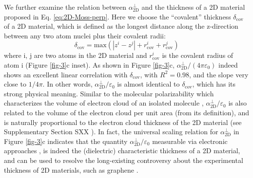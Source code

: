 \documentclass[journal=ancac3,manuscript=article,email=true,hyperref=true,keywords=false]{achemso}
\begin{document}
We further examine the relation between $\alpha_{\mathrm{2D}}^{\perp}$ and the
thickness of a 2D material proposed in
Eq. \ref{eq:2D-Moss-perp}. Here we choose the ``covalent'' thickness
$\delta_{\mathrm{cov}}$ of a 2D material, which is defined as the
longest distance along the z-direction between any two atom nuclei
plus their covalent radii:
\begin{equation}
  \label{eq:cov-thick}
  \delta_{\mathrm{cov}} = \mathrm{max}(|z^{i} - z^{j}|
  + r^{i}_{\mathrm{cov}} + r^{j}_{\mathrm{cov}})
\end{equation}
where i, j are two atoms in the 2D material and $r_{\mathrm{cov}}^{i}$
is the covalent radius of atom i (Figure \ref{fig-3}c inset). As shown
in Figure \ref{fig-3}c,
$\alpha_{\mathrm{2D}}^{\perp}/(4 \pi \varepsilon_{0})$ indeed shows an
excellent linear correlation with $\delta_{\mathrm{cov}}$, with
$R^{2}=0.98$, and the slope very close to $1/4\pi$. In other words,
$\alpha_{\mathrm{2D}}^{\perp} / \varepsilon_{0}$ is almost identical
to $\delta_{\mathrm{cov}}$, which has its strong physical
meaning. Similar to the molecular polarizability which characterizes
the volume of electron cloud of an isolated molecule
\cite{Israelachvili_2011},
$\alpha_{\mathrm{2D}}^{\perp}/\varepsilon_{0}$ is also related to the
volume of the electron cloud per unit area (from its definition), and
is naturally proportional to the electron cloud thickness of the 2D
material (see Supplementary Section SXX ). In fact, the universal
scaling relation for $\alpha_{\mathrm{2D}}^{\perp}$ in Figure \ref{fig-3}c indicates
that the quantity $\alpha_{\mathrm{2D}}^{\perp}/\varepsilon_{0}$ measurable via
electronic approaches
\cite{Antoine_1999,Cherniavskaya_2003,Krauss_1999_EFM}, is indeed the
(dielectric) characteristic thickness of a 2D material, and can be
used to resolve the long-existing controversy about the experimental
thickness of 2D materials, such as graphene \cite{Shearer_2016}.

\iffalse
The universal relations for $\alpha_{\mathrm{2D}}^{\parallel}$ and
$\alpha_{\mathrm{2D}}^{\perp}$ revealed by Eqs. \ref{eq:2D-Moss-para}
and \ref{eq:2D-Moss-perp} are not coincidence. Combining recent
theoretical findings of the linear relation between exciton binding
energy $E_{\mathrm{b}}$ and $E_{\mathrm{g}}$ of 2D materials
\cite{Choi_linear_2015,Olsen_2016_hydrogen,Jiang_2017_Eg_Eb}, and the
fact that the $E_{\mathrm{b}}$ is roughly inversely proportional to
$\alpha_{\mathrm{2D}}^{\parallel}$ \cite{Pulci_2014}, it is reasonable to have a
general Moss-like relation between $E_{\mathrm{g}}$ and
$1/\alpha_{\mathrm{2D}}^{\parallel}$. Moreover, the bandgap-independent relation of
2D $\alpha_{\mathrm{2D}}^{\perp}$ resembles molecular polarizabilities of conjugate
molecules \cite{Davies_1952}, fullerenes \cite{Sabirov_2014} and
carbon nanotubes \cite{Benedict_1995}, which are also shown to be
geometry-dependent.
\fi
\end{document}
